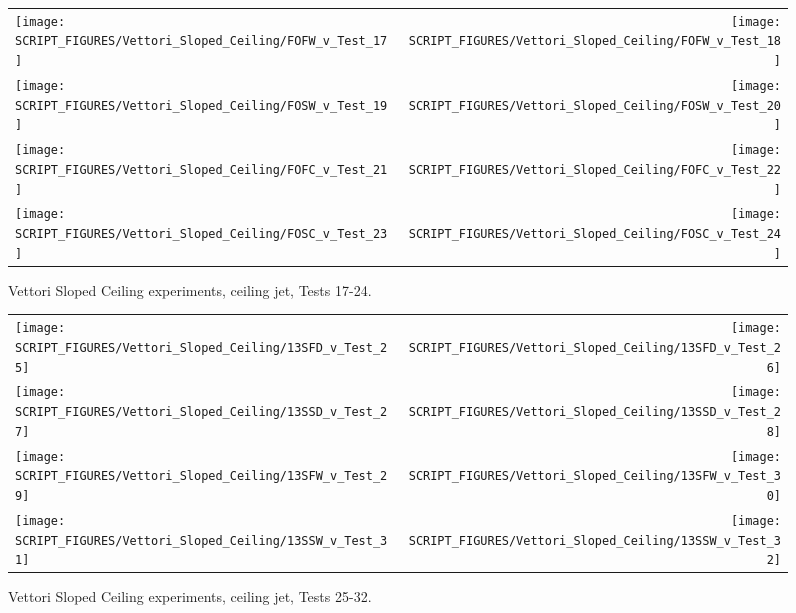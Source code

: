 \begin{figure}[p]
\begin{tabular*}{\textwidth}{l@{\extracolsep{\fill}}r}
\texttt{[image: SCRIPT\_FIGURES/Vettori\_Sloped\_Ceiling/FOFW\_v\_Test\_17]} &
\texttt{[image: SCRIPT\_FIGURES/Vettori\_Sloped\_Ceiling/FOFW\_v\_Test\_18]} \\
\texttt{[image: SCRIPT\_FIGURES/Vettori\_Sloped\_Ceiling/FOSW\_v\_Test\_19]} &
\texttt{[image: SCRIPT\_FIGURES/Vettori\_Sloped\_Ceiling/FOSW\_v\_Test\_20]} \\
\texttt{[image: SCRIPT\_FIGURES/Vettori\_Sloped\_Ceiling/FOFC\_v\_Test\_21]} &
\texttt{[image: SCRIPT\_FIGURES/Vettori\_Sloped\_Ceiling/FOFC\_v\_Test\_22]} \\
\texttt{[image: SCRIPT\_FIGURES/Vettori\_Sloped\_Ceiling/FOSC\_v\_Test\_23]} &
\texttt{[image: SCRIPT\_FIGURES/Vettori\_Sloped\_Ceiling/FOSC\_v\_Test\_24]} \\
\end{tabular*}
\caption[Vettori Sloped Ceiling experiments, ceiling jet, Tests 17-24]{Vettori Sloped Ceiling experiments, ceiling jet, Tests 17-24.}
\label{Vettori_Sloped_3}
\end{figure}

\begin{figure}[p]
\begin{tabular*}{\textwidth}{l@{\extracolsep{\fill}}r}
\texttt{[image: SCRIPT\_FIGURES/Vettori\_Sloped\_Ceiling/13SFD\_v\_Test\_25]} &
\texttt{[image: SCRIPT\_FIGURES/Vettori\_Sloped\_Ceiling/13SFD\_v\_Test\_26]} \\
\texttt{[image: SCRIPT\_FIGURES/Vettori\_Sloped\_Ceiling/13SSD\_v\_Test\_27]} &
\texttt{[image: SCRIPT\_FIGURES/Vettori\_Sloped\_Ceiling/13SSD\_v\_Test\_28]} \\
\texttt{[image: SCRIPT\_FIGURES/Vettori\_Sloped\_Ceiling/13SFW\_v\_Test\_29]} &
\texttt{[image: SCRIPT\_FIGURES/Vettori\_Sloped\_Ceiling/13SFW\_v\_Test\_30]} \\
\texttt{[image: SCRIPT\_FIGURES/Vettori\_Sloped\_Ceiling/13SSW\_v\_Test\_31]} &
\texttt{[image: SCRIPT\_FIGURES/Vettori\_Sloped\_Ceiling/13SSW\_v\_Test\_32]} \\
\end{tabular*}
\caption[Vettori Sloped Ceiling experiments, ceiling jet, Tests 25-32]{Vettori Sloped Ceiling experiments, ceiling jet, Tests 25-32.}
\label{Vettori_Sloped_4}
\end{figure}

